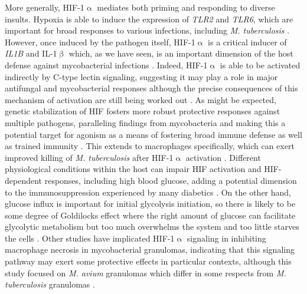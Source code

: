 More generally, HIF\hyp{}1$\upalpha$ mediates both priming and responding to diverse insults. Hypoxia is able to induce the expression of \textit{TLR2} and \textit{TLR6}, which are important for broad responses to various infections, including \textit{M. tuberculosis} \citep{Kuhlicke2007}. However, once induced by the pathogen itself, HIF\hyp{}1$\upalpha$ is a critical inducer of \textit{IL1B} and IL\hyp{}1$\upbeta$ which, as we have seen, is an important dimension of the host defense against mycobacterial infections \citep{Ogryzko2019}. Indeed, HIF\hyp{}1$\upalpha$ is able to be activated indirectly by C\hyp{}type lectin signaling, suggesting it may play a role in major antifungal and mycobacterial responses although the precise consequences of this mechanism of activation are still being worked out \citep{Elder2019, Friedrich2017}. As might be expected, genetic stabilization of HIF fosters more robust protective responses against multiple pathogens, paralleling findings from mycobacteria and making this a potential target for agonism as a means of fostering broad immune defense as well as trained immunity \citep{Schild2020}. This extends to macrophages specifically, which can exert improved killing of \textit{M. tuberculosis} after HIF\hyp{}1$\upalpha$ activation \citep{Li2021}. Different physiological conditions within the host can impair HIF activation and HIF\hyp{}dependent responses, including high blood glucose, adding a potential dimension to the immunosuppression experienced by many diabetics \citep{Teran2022}. On the other hand, glucose influx is important for initial glycolysis initiation, so there is likely to be some degree of Goldilocks effect where the right amount of glucose can facilitate glycolytic metabolism but too much overwhelms the system and too little starves the cells \citep{Stunault2018}. Other studies have implicated HIF\hyp{}1$\upalpha$ signaling in inhibiting macrophage necrosis in mycobacterial granulomas, indicating that this signaling pathway may exert some protective effects in particular contexts, although this study focused on \textit{M. avium} granulomas which differ in some respects from \textit{M. tuberculosis} granulomas \citep{Cardoso2015}.


